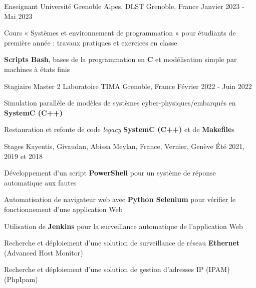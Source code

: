 \begin{cventries}
	\cventry
	{Enseignant} %
	{Université Grenoble Alpes, DLST} %
	{Grenoble, France} %
	{Janvier 2023 - Mai 2023} %
	{
		\begin{cvitems} %
		\item{Cours « Systèmes et environnement de programmation » pour étudiants de première année : travaux pratiques et exercices en classe}
		\item{\textbf{Scripts Bash}, bases de la programmation en \textbf{C} et modélisation simple par machines à états finis}
		\end{cvitems}
	}

	\cventry
	{Stagiaire Master 2} %
	{Laboratoire TIMA} %
	{Grenoble, France} %
	{Février 2022 - Juin 2022} %
	{
		\begin{cvitems} %
		\item{Simulation parallèle de modèles de systèmes cyber-physiques/embarqués en \textbf{SystemC (C++)}}
		\item{Restauration et refonte de code \emph{legacy} \textbf{SystemC (C++)} et de \textbf{Makefile}s	}		
		\end{cvitems}
	}

	\cventry
	{Stages} %
	{Kayentis, Givaudan, Abissa} %
	{Meylan, France, Vernier, Genève} %
	{Été 2021, 2019 et 2018} %
	{
		\begin{cvitems} %
		\item{Développement d'un script \textbf{PowerShell} pour un système de réponse automatique aux fautes}
		\item{Automatisation de navigateur web avec \textbf{Python Selenium} pour vérifier le fonctionnement d'une application Web}
		\item{Utilisation de \textbf{Jenkins} pour la surveillance automatique de l'application Web}
		\item{Recherche et déploiement d'une solution de surveillance de réseau \textbf{Ethernet} (Advanced Host Monitor)}
		\item{Recherche et déploiement d'une solution de gestion d'adresses IP (IPAM) (PhpIpam)}
		\end{cvitems}
	}

\end{cventries}
